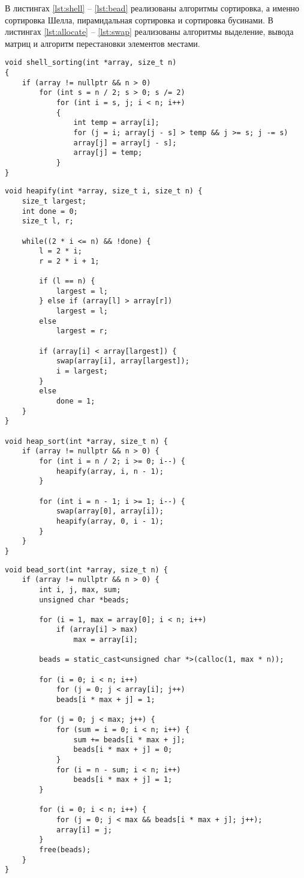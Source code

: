 В листингах \ref{lst:shell} -- \ref{lst:bead} реализованы алгоритмы сортировка, а именно сортировка Шелла, пирамидальная сортировка и сортировка бусинами.
В листингах \ref{lst:allocate} -- \ref{lst:swap} реализованы алгоритмы выделение, вывода матриц и алгоритм перестановки элементов местами.

\clearpage

\begin{lstlisting}[label=lst:shell,caption=Функция сортировки методом Шелла]
void shell_sorting(int *array, size_t n)
{
	if (array != nullptr && n > 0)
		for (int s = n / 2; s > 0; s /= 2)
			for (int i = s, j; i < n; i++)
			{
				int temp = array[i];
				for (j = i; array[j - s] > temp && j >= s; j -= s)
				array[j] = array[j - s];
				array[j] = temp;
			}
}
\end{lstlisting}

\clearpage

\begin{lstlisting}[label=lst:heap,caption=Функция пирамидальной сортировки]
void heapify(int *array, size_t i, size_t n) {
	size_t largest;
	int done = 0;
	size_t l, r;
	
	while((2 * i <= n) && !done) {
		l = 2 * i;
		r = 2 * i + 1;
		
		if (l == n) {
			largest = l;
		} else if (array[l] > array[r])
			largest = l;
		else
			largest = r;
		
		if (array[i] < array[largest]) {
			swap(array[i], array[largest]);
			i = largest;
		}
		else
			done = 1;
	}
}

void heap_sort(int *array, size_t n) {
	if (array != nullptr && n > 0) {
		for (int i = n / 2; i >= 0; i--) {
			heapify(array, i, n - 1);
		}
		
		for (int i = n - 1; i >= 1; i--) {
			swap(array[0], array[i]);
			heapify(array, 0, i - 1);
		}
	}
}
\end{lstlisting}

\clearpage

\begin{lstlisting}[label=lst:bead,caption=Функция сортировки бусинами]
void bead_sort(int *array, size_t n) {
	if (array != nullptr && n > 0) {
		int i, j, max, sum;
		unsigned char *beads;
		
		for (i = 1, max = array[0]; i < n; i++)
			if (array[i] > max)
				max = array[i];
		
		beads = static_cast<unsigned char *>(calloc(1, max * n));
		
		for (i = 0; i < n; i++)
			for (j = 0; j < array[i]; j++)
			beads[i * max + j] = 1;
		
		for (j = 0; j < max; j++) {
			for (sum = i = 0; i < n; i++) {
				sum += beads[i * max + j];
				beads[i * max + j] = 0;
			}
			for (i = n - sum; i < n; i++)
				beads[i * max + j] = 1;
		}
		
		for (i = 0; i < n; i++) {
			for (j = 0; j < max && beads[i * max + j]; j++);
			array[i] = j;
		}
		free(beads);
	}
}
\end{lstlisting}

